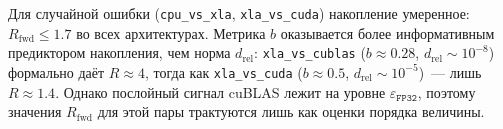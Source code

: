 \begin{table}[htbp]
    \centering
    \caption{Коэффициент накопления $R_{\text{fwd}}$ по группам компонентов
        ($^\dagger$~для \texttt{xla\_vs\_cublas} приведены оценки порядка величины:
        сигнал на уровне $\varepsilon_{\texttt{FP32}}$).}
    \label{tab:rfwd}
\end{table}

Для случайной ошибки (\texttt{cpu\_vs\_xla}, \texttt{xla\_vs\_cuda}) накопление
умеренное: $R_{\text{fwd}}\le1.7$ во всех архитектурах. Метрика $b$ оказывается
более информативным предиктором накопления, чем норма $d_{\text{rel}}$:
\texttt{xla\_vs\_cublas} ($b\approx0.28$, $d_{\text{rel}}\sim10^{-8}$) формально
даёт $R\approx4$, тогда как \texttt{xla\_vs\_cuda} ($b\approx0.5$,
$d_{\text{rel}}\sim10^{-5}$)~--- лишь $R\approx1.4$. Однако послойный сигнал
cuBLAS лежит на уровне $\varepsilon_{\texttt{FP32}}$, поэтому значения
$R_{\text{fwd}}$ для этой пары трактуются лишь как оценки порядка величины.

